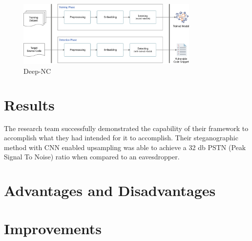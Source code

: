 \documentclass[]{article}
\begin{document}
\begin{figure}[h]
	\centering
	\includegraphics[width=0.8\textwidth]{Algorithm}
	\caption{Deep-NC \cite{Vien2021}}
\end{figure}

\section{Results}

The research team successfully demonstrated the capability of their framework to accomplish what they had intended for it to accomplish. Their steganographic method with CNN enabled upsampling was able to achieve a 32 db PSTN (Peak Signal To Noise) ratio when compared to an eavesdropper.

\section{Advantages and Disadvantages}





\section{Improvements}




\clearpage


\end{document}
